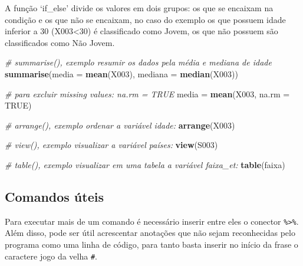 \documentclass[
  brazil,
]{book}
\newenvironment{Shaded}{\begin{snugshade}}{\end{snugshade}}
\newcommand{\CommentTok}[1]{\textcolor[rgb]{0.56,0.35,0.01}{\textit{#1}}}
\newcommand{\DataTypeTok}[1]{\textcolor[rgb]{0.13,0.29,0.53}{#1}}
\newcommand{\KeywordTok}[1]{\textcolor[rgb]{0.13,0.29,0.53}{\textbf{#1}}}
\newcommand{\NormalTok}[1]{#1}
\newcommand{\OperatorTok}[1]{\textcolor[rgb]{0.81,0.36,0.00}{\textbf{#1}}}
\newcommand{\OtherTok}[1]{\textcolor[rgb]{0.56,0.35,0.01}{#1}}
\newcommand{\StringTok}[1]{\textcolor[rgb]{0.31,0.60,0.02}{#1}}
\begin{document}
A função `if\_else' divide os valores em dois grupos: os que se encaixam na condição e os que não se encaixam, no caso do exemplo os que possuem idade inferior a 30 (X003\textless30) é classificado como Jovem, os que não possuem são classificados como Não Jovem.

\begin{Shaded}
\begin{Highlighting}[]
\CommentTok{# summarise(), exemplo resumir os dados pela média e mediana de idade }
\KeywordTok{summarise}\NormalTok{(}\DataTypeTok{media =} \KeywordTok{mean}\NormalTok{(X003), }\DataTypeTok{mediana =} \KeywordTok{median}\NormalTok{(X003))}

\CommentTok{# para excluir missing values: na.rm = TRUE}
\NormalTok{media =}\StringTok{ }\KeywordTok{mean}\NormalTok{(X003, }\DataTypeTok{na.rm =} \OtherTok{TRUE}\NormalTok{)}

\CommentTok{# arrange(), exemplo ordenar a variável idade: }
\KeywordTok{arrange}\NormalTok{(X003)}

\CommentTok{# view(), exemplo visualizar a variável países: }
\KeywordTok{view}\NormalTok{(S003)}

\CommentTok{# table(), exemplo visualizar em uma tabela a variável faixa_et: }
\KeywordTok{table}\NormalTok{(faixa)}
\end{Highlighting}
\end{Shaded}

\hypertarget{comandos-uxfateis}{%
\subsection{Comandos úteis}\label{comandos-uxfateis}}

Para executar mais de um comando é necessário inserir entre eles o conector \texttt{\%\textgreater{}\%}. Além disso, pode ser útil acrescentar anotações que não sejam reconhecidas pelo programa como uma linha de código, para tanto basta inserir no início da frase o caractere jogo da velha \texttt{\#}.

\begin{Shaded}
\end{Shaded}
\end{document}
